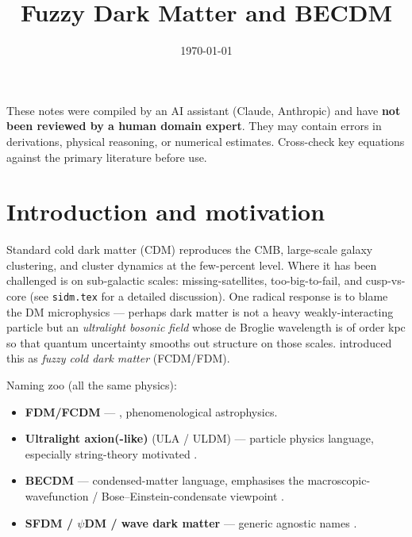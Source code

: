 \documentclass[12pt]{article}
\title{Fuzzy Dark Matter and BECDM}
\author{}
\date{\today}
\begin{document}
\maketitle
\tableofcontents
\newpage

\begin{tcolorbox}[colback=yellow!10!white, colframe=orange!75!black,
                  title={\bfseries Disclaimer}]
These notes were compiled by an AI assistant (Claude, Anthropic) and have
\textbf{not been reviewed by a human domain expert}.  They may contain
errors in derivations, physical reasoning, or numerical estimates.
Cross-check key equations against the primary literature before use.
\end{tcolorbox}
\vspace{0.5em}

\section{Introduction and motivation}
\label{sec:intro}

Standard cold dark matter (CDM) reproduces the CMB, large-scale
galaxy clustering, and cluster dynamics at the few-percent level.
Where it has been challenged is on sub-galactic scales:
missing-satellites, too-big-to-fail, and cusp-vs-core (see
\texttt{sidm.tex} for a detailed discussion).  One radical response is
to blame the DM microphysics --- perhaps dark matter is not a heavy
weakly-interacting particle but an \emph{ultralight bosonic field}
whose de Broglie wavelength is of order kpc so that quantum
uncertainty smooths out structure on those scales.  \citet{Hu2000}
introduced this as \emph{fuzzy cold dark matter} (FCDM/FDM).

Naming zoo (all the same physics):
\begin{itemize}
  \item \textbf{FDM/FCDM} --- \citet{Hu2000}, phenomenological
        astrophysics.
  \item \textbf{Ultralight axion(-like)} (ULA / ULDM) --- particle
        physics language, especially string-theory motivated
        \citep{Arvanitaki2010,Marsh2016}.
  \item \textbf{BECDM} --- condensed-matter language, emphasises the
        macroscopic-wavefunction / Bose--Einstein-condensate viewpoint
        \citep{Mocz2017,Mocz2020}.
  \item \textbf{SFDM / $\psi$DM / wave dark matter} --- generic
        agnostic names \citep{Schive2014,Schive2014b}.
\end{itemize}
\end{document}
